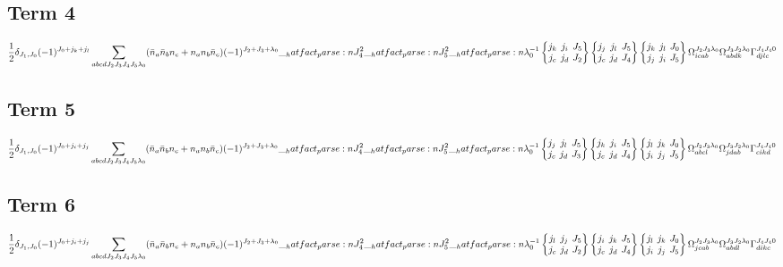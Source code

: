 \documentclass{scrartcl}
\newcommand{\sixj}[6]{\begingroup\setlength{\arraycolsep}{0.2em}\begin{Bmatrix} #1 & #2 & #3 \\ #4 & #5 & #6 \end{Bmatrix}\endgroup}
\begin{document}
\subsection{Term 4}
\begin{dmath*}
\frac{1}{2} \* \delta_{{J}_{1},{J}_{0}} \* (-1)^{{J}_{0}+{j}_{k}+{j}_{l}} \* \sum_{a b c d {J}_{2} {J}_{3} {J}_{4} {J}_{5} {{\lambda}}_{0}} \* (\bar{n}_{a} \* \bar{n}_{b} \* n_{c} + n_{a} \* n_{b} \* \bar{n}_{c}) \* (-1)^{{J}_{2}+{J}_{3}+{{\lambda}}_{0}} \* \hatfact{{J}_{4}^{2}} \* \hatfact{{J}_{5}^{2}} \* \hatfact{{{\lambda}}_{0}^{-1}} \* \sixj{{j}_{k}}{{j}_{i}}{{J}_{5}}{{j}_{c}}{{j}_{d}}{{J}_{2}} \* \sixj{{j}_{j}}{{j}_{l}}{{J}_{5}}{{j}_{c}}{{j}_{d}}{{J}_{4}} \* \sixj{{j}_{k}}{{j}_{l}}{{J}_{0}}{{j}_{j}}{{j}_{i}}{{J}_{5}} \* \Omega_{i c a b}^{{J}_{2} {J}_{3} {{\lambda}}_{0}} \* \Omega_{a b d k}^{{J}_{3} {J}_{2} {{\lambda}}_{0}} \* \Gamma_{d j l c}^{{J}_{4} {J}_{4} 0}
\end{dmath*}
\subsection{Term 5}
\begin{dmath*}
\frac{1}{2} \* \delta_{{J}_{1},{J}_{0}} \* (-1)^{{J}_{0}+{j}_{i}+{j}_{j}} \* \sum_{a b c d {J}_{2} {J}_{3} {J}_{4} {J}_{5} {{\lambda}}_{0}} \* (\bar{n}_{a} \* \bar{n}_{b} \* n_{c} + n_{a} \* n_{b} \* \bar{n}_{c}) \* (-1)^{{J}_{2}+{J}_{3}+{{\lambda}}_{0}} \* \hatfact{{J}_{4}^{2}} \* \hatfact{{J}_{5}^{2}} \* \hatfact{{{\lambda}}_{0}^{-1}} \* \sixj{{j}_{j}}{{j}_{l}}{{J}_{5}}{{j}_{c}}{{j}_{d}}{{J}_{3}} \* \sixj{{j}_{k}}{{j}_{i}}{{J}_{5}}{{j}_{c}}{{j}_{d}}{{J}_{4}} \* \sixj{{j}_{l}}{{j}_{k}}{{J}_{0}}{{j}_{i}}{{j}_{j}}{{J}_{5}} \* \Omega_{a b c l}^{{J}_{2} {J}_{3} {{\lambda}}_{0}} \* \Omega_{j d a b}^{{J}_{3} {J}_{2} {{\lambda}}_{0}} \* \Gamma_{c i k d}^{{J}_{4} {J}_{4} 0}
\end{dmath*}
\subsection{Term 6}
\begin{dmath*}
\frac{1}{2} \* \delta_{{J}_{1},{J}_{0}} \* (-1)^{{J}_{0}+{j}_{i}+{j}_{j}} \* \sum_{a b c d {J}_{2} {J}_{3} {J}_{4} {J}_{5} {{\lambda}}_{0}} \* (\bar{n}_{a} \* \bar{n}_{b} \* n_{c} + n_{a} \* n_{b} \* \bar{n}_{c}) \* (-1)^{{J}_{2}+{J}_{3}+{{\lambda}}_{0}} \* \hatfact{{J}_{4}^{2}} \* \hatfact{{J}_{5}^{2}} \* \hatfact{{{\lambda}}_{0}^{-1}} \* \sixj{{j}_{l}}{{j}_{j}}{{J}_{5}}{{j}_{c}}{{j}_{d}}{{J}_{2}} \* \sixj{{j}_{i}}{{j}_{k}}{{J}_{5}}{{j}_{c}}{{j}_{d}}{{J}_{4}} \* \sixj{{j}_{l}}{{j}_{k}}{{J}_{0}}{{j}_{i}}{{j}_{j}}{{J}_{5}} \* \Omega_{j c a b}^{{J}_{2} {J}_{3} {{\lambda}}_{0}} \* \Omega_{a b d l}^{{J}_{3} {J}_{2} {{\lambda}}_{0}} \* \Gamma_{d i k c}^{{J}_{4} {J}_{4} 0}
\end{dmath*}
\end{document}
